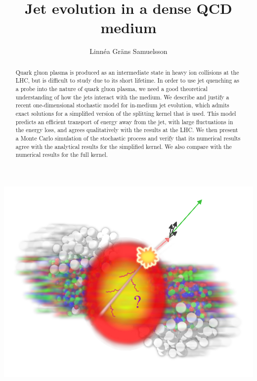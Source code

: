 \documentclass[a4paper,12pt]{article}
\numberwithin{equation}{section}
\begin{document}
\author{Linnéa Gräns Samuelsson}
\title{Jet evolution in a dense QCD medium}

\begin{titlepage}
\maketitle 
\thispagestyle{fancy}
\renewcommand{\headrulewidth}{0pt}

\begin{abstract}
Quark gluon plasma is produced as an intermediate state in heavy ion collisions at the LHC, but is difficult to study due to its short lifetime. In order to use jet quenching as a probe into the nature of quark gluon plasma, we need a good theoretical understanding of how the jets interact with the medium. We describe and justify a recent one-dimensional stochastic model for in-medium jet evolution, which admits exact solutions for a simplified version of the splitting kernel that is used. This model predicts an efficient transport of energy away from the jet, with large fluctuations in the energy loss, and agrees qualitatively with the results at the LHC. We then present a Monte Carlo simulation of the stochastic process and verify that its numerical results agree with the analytical results for the simplified kernel. We also compare with the numerical results for the full kernel.
\end{abstract}



\begin{center}
\includegraphics[width=0.5\linewidth]{jet-quenching.jpg}


\end{center}



\end{titlepage}
\end{document}
